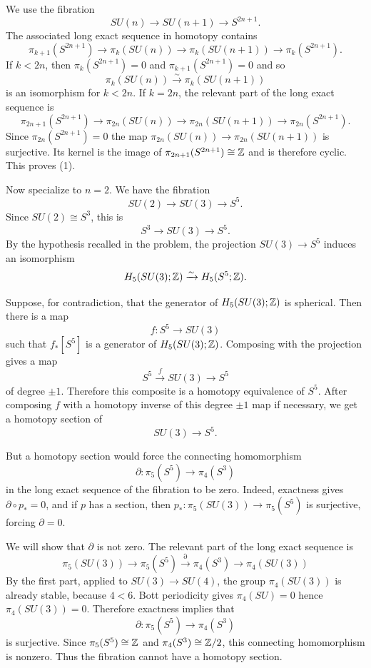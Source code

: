 \documentclass[12pt]{article}
\begin{document}
\begin{solution}
        We use the fibration
    \[
        SU(n)\longrightarrow SU(n+1)\longrightarrow S^{2n+1}.
    \]
    The associated long exact sequence in homotopy contains
    \[
        \pi_{k+1}(S^{2n+1})\to \pi_k(SU(n))
        \to \pi_k(SU(n+1))\to \pi_k(S^{2n+1}).
    \]
    If $k<2n$, then $\pi_k(S^{2n+1})=0$ and $\pi_{k+1}(S^{2n+1})=0$ and so
    \[
        \pi_k(SU(n))\xrightarrow{\sim}\pi_k(SU(n+1))
    \]
    is an isomorphism for $k<2n$. If $k=2n$, the relevant part of the long exact sequence is
    \[
        \pi_{2n+1}(S^{2n+1})\to \pi_{2n}(SU(n))
        \to \pi_{2n}(SU(n+1))\to \pi_{2n}(S^{2n+1}).
    \]
    Since $\pi_{2n}(S^{2n+1})=0$ the map $\pi_{2n}(SU(n))\to \pi_{2n}(SU(n+1))$
    is surjective. Its kernel is the image of $\pi_{2n+1}(S^{2n+1})\cong \mathbb{Z}$ and is therefore cyclic. This proves (1).

    Now specialize to $n=2$. We have the fibration
    \[
        SU(2)\longrightarrow SU(3)\longrightarrow S^5.
    \]
    Since $SU(2)\cong S^3$, this is
    \[
        S^3\longrightarrow SU(3)\longrightarrow S^5.
    \]
    By the hypothesis recalled in the problem, the projection $SU(3)\to S^5$
    induces an isomorphism
    \[
        H_5(SU(3);\mathbb{Z})\xrightarrow{\sim}H_5(S^5;\mathbb{Z}).
    \]

    Suppose, for contradiction, that the generator of $H_5(SU(3);\mathbb{Z})$ is spherical. Then there is a map
    \[
        f:S^5\to SU(3)
    \]
    such that $f_*[S^5]$ is a generator of $H_5(SU(3);\mathbb{Z})$. Composing with the projection gives a map
    \[
        S^5\xrightarrow{f}SU(3)\to S^5
    \]
    of degree $\pm 1$. Therefore this composite is a homotopy equivalence of $S^5$. After composing $f$ with a homotopy inverse of this degree $\pm 1$ map if necessary, we get a homotopy section of
    \[
        SU(3)\to S^5.
    \]

    But a homotopy section would force the connecting homomorphism
    \[
        \partial:\pi_5(S^5)\to \pi_4(S^3)
    \]
    in the long exact sequence of the fibration to be zero. Indeed, exactness gives $\partial\circ p_*=0$, and if $p$ has a section, then $p_*:\pi_5(SU(3))\to \pi_5(S^5)$ is surjective, forcing $\partial=0$.

    We will show that $\partial$ is not zero. The relevant part of the long exact sequence is
    \[
        \pi_5(SU(3))\to \pi_5(S^5)\xrightarrow{\partial}\pi_4(S^3) \to \pi_4(SU(3))
    \]
    By the first part, applied to $SU(3)\to SU(4)$, the group $\pi_4(SU(3))$ is already stable, because $4<6$. Bott periodicity gives $\pi_4(SU) = 0$
    hence $\pi_4(SU(3))=0$.
    Therefore exactness implies that
    \[
        \partial:\pi_5(S^5)\to \pi_4(S^3)
    \]
    is surjective. Since $\pi_5(S^5)\cong \mathbb{Z}$ and $\pi_4(S^3)\cong \mathbb{Z}/2$, this connecting homomorphism is nonzero. Thus the fibration cannot have a homotopy section.


\end{solution}
\end{document}

